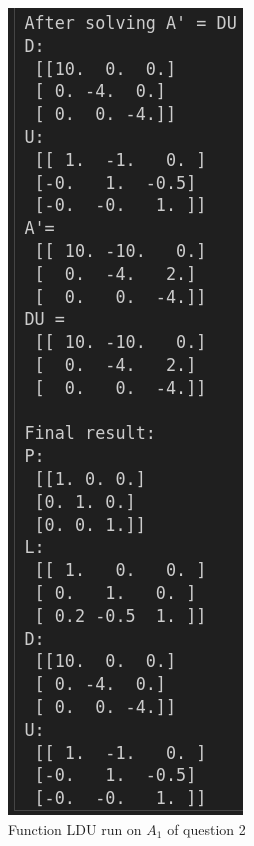 \documentclass[conference,onecolumn]{IEEEtran}
\begin{document}
\begin{enumerate}[label=\arabic{enumi}.]
\begin{figure}[t]
\begin{minipage}[t]{0.25\textwidth}
              \end{minipage}%
              \begin{minipage}[t]{0.33\textwidth}
                  \centering
                  \includegraphics[width=\textwidth]{figs/LDU3.png}
              \end{minipage}
              \caption{Function LDU run on $A_1$ of question 2}
              \label{fig: A_1 LDU}
          \end{figure}


\end{enumerate}
\end{document}
